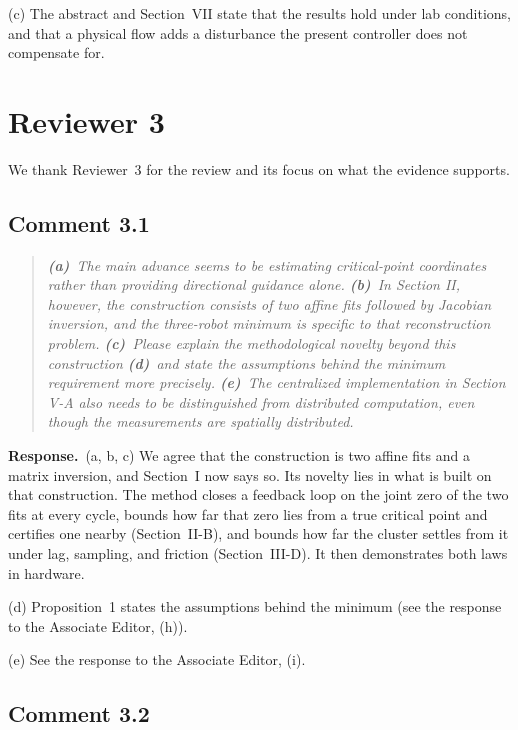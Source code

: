 \documentclass[10pt]{article}
\newcommand{\resp}{\par\textbf{Response.}~}
\begin{document}
(c) The abstract and Section~VII state that the results hold under lab conditions, and that a physical flow adds a disturbance the present controller does not compensate for.

\section*{Reviewer 3}
We thank Reviewer~3 for the review and its focus on what the evidence supports.

\subsection*{Comment 3.1}

\begin{quote}\itshape
\textbf{(a)}~The main advance seems to be estimating critical-point coordinates rather than providing directional guidance alone.
\textbf{(b)}~In Section II, however, the construction consists of two affine fits followed by Jacobian inversion, and the three-robot minimum is specific to that reconstruction problem.
\textbf{(c)}~Please explain the methodological novelty beyond this construction
\textbf{(d)}~and state the assumptions behind the minimum requirement more precisely.
\textbf{(e)}~The centralized implementation in Section V-A also needs to be distinguished from distributed computation, even though the measurements are spatially distributed.
\end{quote}


\resp (a, b, c) We agree that the construction is two affine fits and a matrix inversion, and Section~I now says so. Its novelty lies in what is built on that construction. The method closes a feedback loop on the joint zero of the two fits at every cycle, bounds how far that zero lies from a true critical point and certifies one nearby (Section~II-B), and bounds how far the cluster settles from it under lag, sampling, and friction (Section~III-D). It then demonstrates both laws in hardware.

(d) Proposition~1 states the assumptions behind the minimum (see the response to the Associate Editor, (h)).

(e) See the response to the Associate Editor, (i).

\subsection*{Comment 3.2}
\end{document}
